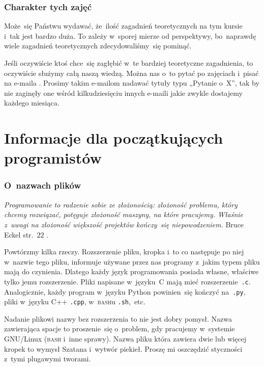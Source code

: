 \documentclass[10pt,t]{beamer}
\begin{document}
\begin{frame}
  \frametitle{Charakter tych zajęć}


  Może~się Państwu wydawać, że~ilość zagadnień teoretycznych na tym kursie
  i~tak jest bardzo duża. To zależy w~sporej mierze od perspektywy,
  bo~naprawdę wiele zagadnień teoretycznych zdecydowaliśmy~się pominąć.

  Jeśli oczywiście ktoś chce~się zagłębić w~te bardziej teoretyczne
  zagadnienia, to oczywiście służymy całą naszą wiedzą. Można
  nas o~to pytać po zajęciach i~pisać na e-maila \email.
  Prosimy takim e-mailom nadawać tytuły typu „Pytanie o~X”, tak by nie
  zaginęły one wśród kilkudziesięciu innych e-maili jakie zwykle dostajemy
  każdego miesiąca.

\end{frame}










\section{Informacje dla początkujących programistów}



\begin{frame}
  \frametitle{O~nazwach plików}


    \textit{Programowanie to radzenie sobie ze złożonością: złożoność
    problemu, który chcemy rozwiązać, potęguje złożoność maszyny, na które
    pracujemy. Właśnie z~uwagi na złożoność większość projektów kończy~się
    niepowodzeniem.} Bruce Eckel
  str.~$22$ \parencite{Eckel-Thinnking-in-Java-Ed-polska-Wyd-III-Pub-2003}.

  Powtórzmy kilka rzeczy. Rozszerzenie pliku, kropka i~to co następuje po
  niej w~nazwie tego pliku, informuje używane przez nas programy z~jakim
  typem pliku mają do czynienia. Dlatego każdy język programowania posiada
  własne, właściwe tylko jemu rozszerzenie. Pliki napisane w~języku~C mają
  mieć rozszerzenie~\texttt{.c}. Analogicznie, każdy program w~języku Python
  powinien~się kończyć na~\texttt{.py}, pliki w~języku C++ \texttt{.cpp},
  w~\textsc{bash}u \texttt{.sh},~etc.

  Nadanie plikowi nazwy bez rozszerzenia to nie jest dobry pomysł. Nazwa
  zawierająca spacje to proszenie~się o~problem, gdy pracujemy w~systemie
  GNU/Linux (\textsc{bash} i~inne sprawy). Nazwa pliku która zawiera
  dwie lub więcej kropek to wymysł Szatana i~wytwór piekieł. Proszę mi
  oszczędzić styczności z~tymi plugawymi tworami.

\end{frame}
\end{document}

